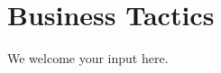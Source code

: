 \section{Business Tactics}%
\label{sec:ekg-mm-a-1-3}
\label{sec:ekg-mm-business-tactics}




\ekgmmContextSection

We welcome your input here.
